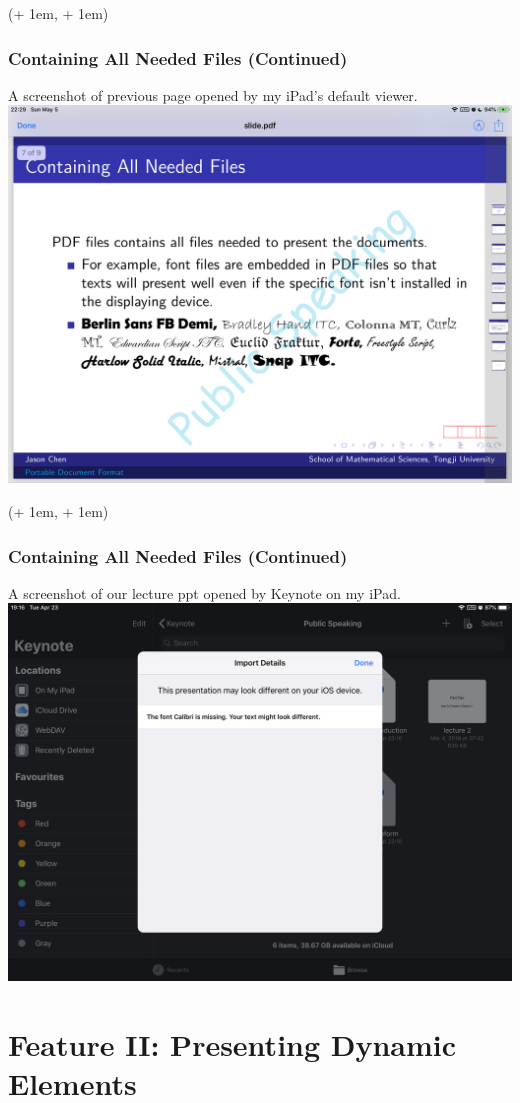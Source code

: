 \documentclass[xcolor=dvipsnames]{beamer}
\newcommand{\FrameTextCrono}[1]{
    \begin{textblock*}{\paperwidth}(\textwidth + 1em, \textheight + 1em)
        #1
    \end{textblock*}
}
\let\oldframe\frame
\let\oldendframe\endframe
\renewenvironment{frame}
    {\oldframe\FrameTextCrono{\small\color{blue}{\crono}}}
    {\oldendframe}
\begin{document}
    \begin{frame}
        \frametitle{Containing All Needed Files (Continued)}
        A screenshot of previous page opened by my iPad's default viewer.
        \centering
        \includegraphics[scale=0.09]{fonts.png}
    \end{frame}

    \begin{frame}
        \frametitle{Containing All Needed Files (Continued)}
        A screenshot of our lecture ppt opened by Keynote on my iPad.
        \centering
        \includegraphics[scale=0.09]{missing_fonts.png}
    \end{frame}

    \section{Feature II: Presenting Dynamic Elements}
\end{document}
